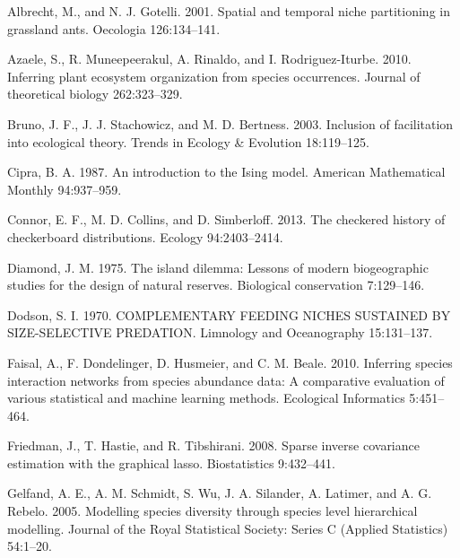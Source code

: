 \documentclass[12pt,]{article}
\begin{document}
\begin{spacing}{1.9}
\begin{flushleft}
Albrecht, M., and N. J. Gotelli. 2001. Spatial and temporal niche
partitioning in grassland ants. Oecologia 126:134--141.

Azaele, S., R. Muneepeerakul, A. Rinaldo, and I. Rodriguez-Iturbe. 2010.
Inferring plant ecosystem organization from species occurrences. Journal
of theoretical biology 262:323--329.

Bruno, J. F., J. J. Stachowicz, and M. D. Bertness. 2003. Inclusion of
facilitation into ecological theory. Trends in Ecology \& Evolution
18:119--125.

Cipra, B. A. 1987. An introduction to the Ising model. American
Mathematical Monthly 94:937--959.

Connor, E. F., M. D. Collins, and D. Simberloff. 2013. The checkered
history of checkerboard distributions. Ecology 94:2403--2414.

Diamond, J. M. 1975. The island dilemma: Lessons of modern biogeographic
studies for the design of natural reserves. Biological conservation
7:129--146.

Dodson, S. I. 1970. COMPLEMENTARY FEEDING NICHES SUSTAINED BY
SIZE-SELECTIVE PREDATION. Limnology and Oceanography 15:131--137.

Faisal, A., F. Dondelinger, D. Husmeier, and C. M. Beale. 2010.
Inferring species interaction networks from species abundance data: A
comparative evaluation of various statistical and machine learning
methods. Ecological Informatics 5:451--464.

Friedman, J., T. Hastie, and R. Tibshirani. 2008. Sparse inverse
covariance estimation with the graphical lasso. Biostatistics
9:432--441.

Gelfand, A. E., A. M. Schmidt, S. Wu, J. A. Silander, A. Latimer, and A.
G. Rebelo. 2005. Modelling species diversity through species level
hierarchical modelling. Journal of the Royal Statistical Society: Series
C (Applied Statistics) 54:1--20.


\end{flushleft}
\end{spacing}
\end{document}
